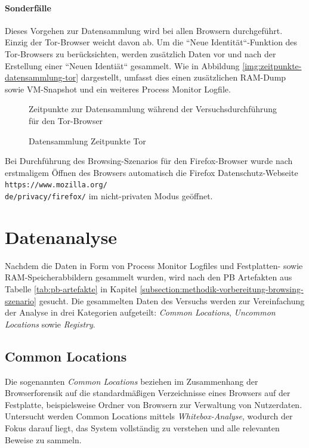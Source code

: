 \paragraph*{Sonderfälle}
Dieses Vorgehen zur Datensammlung wird bei allen Browsern durchgeführt. Einzig der Tor-Browser weicht davon ab. Um die ``Neue Identität``-Funktion des Tor-Browsers zu berücksichten, werden zusätzlich Daten vor und nach der Erstellung einer ``Neuen Identiät`` gesammelt. Wie in Abbildung \ref{img:zeitpunkte-datensammlung-tor} dargestellt, umfasst dies einen zusätzlichen RAM-Dump sowie VM-Snapshot und ein weiteres Process Monitor Logfile.
\begin{figure}[h!]
	\caption{Zeitpunkte zur Datensammlung während der Versuchsdurchführung für den Tor-Browser}
	\label{img:zeitpunkte-datensammlung-tor}
	\centering
	\small
	\centerline{\resizebox{\linewidth}{!}{}}
	\caption{Datensammlung Zeitpunkte Tor}
	\label{fig:jes}
\end{figure}

Bei Durchführung des Browsing-Szenarios für den Firefox-Browser wurde nach erstmaligem Öffnen des Browsers automatisch die Firefox Datenschutz-Webseite \texttt{https://www.mozilla.org/\\
de/privacy/firefox/} im nicht-privaten Modus geöffnet. 

\section{Datenanalyse}
\label{section:methodik-datenanalyse}
Nachdem die Daten in Form von Process Monitor Logfiles und Festplatten- sowie RAM-Speicherabbildern gesammelt wurden, wird nach den PB Artefakten aus Tabelle \ref{tab:pb-artefakte} in Kapitel \ref{subsection:methodik-vorbereitung-browsing-szenario} gesucht. 
Die gesammelten Daten des Versuchs werden zur Vereinfachung der Analyse in drei Kategorien aufgeteilt: \textit{Common Locations}, \textit{Uncommon Locations} sowie \textit{Registry}.

\subsection{Common Locations}
\label{subsection:methodik-datenanalyse-commonlocations}
Die sogenannten \textit{Common Locations} beziehen im Zusammenhang der Browserforensik auf die standardmäßigen Verzeichnisse eines Browsers auf der Festplatte, beispielsweise Ordner von Browsern zur Verwaltung von Nutzerdaten.
Untersucht werden Common Locations mittels \textit{Whitebox-Analyse}, 
wodurch der Fokus darauf liegt, das System vollständig zu verstehen und alle relevanten Beweise zu sammeln. \cite{Bonetti.2014}

